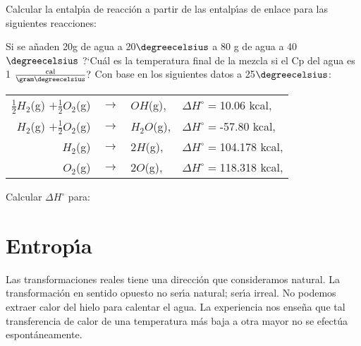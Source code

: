 \begin{exercises}
\exer Calcular la entalp\'{\i}a de reacci\'on a partir de las entalp\'{\i}as de enlace para las siguientes reacciones:
\subexer {}

\subexer {}

\subexer{}

\exer Si se a\~naden 20g de agua a 20$\degreecelsius$ a 80 g de agua a 40 $\degreecelsius$ ?`Cu\'al es la temperatura final de la mezcla si el Cp del agua es 1 $\frac{\textrm{cal}}{\gram\degreecelsius}?$
\exer Con base en los siguientes datos a 25$\degreecelsius$:

{\centering
\vskip6pt
\begin{tabular}{rcll} 
$\frac{1}{2}H_2${\footnotesize (g)}
$+\frac{1}{2}O_2${\footnotesize (g)}  &
$\longrightarrow$ &
$OH${\footnotesize (g)},&
$\Delta H^\circ = $10.06 kcal,\\
$H_2${\footnotesize (g)}
$+\frac{1}{2}O_2${\footnotesize (g)} &
$\longrightarrow$ &
$H_2O${\footnotesize (g)},&
$\Delta H^\circ = $-57.80 kcal,\\ 
$ H_2${\footnotesize (g)} &
$\longrightarrow$ &
$2H${\footnotesize (g)},&
$\Delta H^\circ = $104.178 kcal,\\
$ O_2${\footnotesize (g)} &
$\longrightarrow$ &
$2O${\footnotesize (g)},&
$\Delta H^\circ = $118.318 kcal,\\
\end{tabular}
\vskip6pt
}
Calcular $\Delta H^\circ$ para:
\subexer {}
\subexer {}
\subexer {}
\end{exercises}


\section[Entropia]{Entrop\'{\i}a}

Las transformaciones reales tiene una direcci\'on que consideramos natural. La transformaci\'on en sentido opuesto no ser\'{\i}a natural; ser\'{\i}a irreal. No podemos extraer calor del hielo para calentar el agua. La experiencia nos ense\~na  que tal transferencia de calor de una temperatura m\'as baja a otra mayor no se efect\'ua espont\'aneamente.

